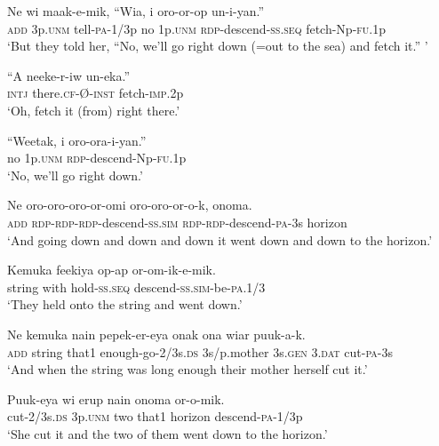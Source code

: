 \ea
\gll  Ne  wi  maak-e-mik,  “Wia,  i  oro-or-op            un-i-yan.” \\
\textsc{add}  3p.\textsc{unm}  tell-\textsc{pa}-1/3p  no  1p.\textsc{unm}  \textsc{rdp}-descend-\textsc{ss.seq} fetch-Np-\textsc{fu}.1p \\


\glt ‘But they told her, “No, we’ll go right down (=out to the sea) and fetch it.” ’ \\
\z


\ea
\gll  “A  neeke-r-iw  un-eka.” \\
\textsc{intj}  there.\textsc{cf}-Ø-\textsc{inst}  fetch-\textsc{imp}.2p \\
\glt ‘Oh, fetch it (from) right there.’ \\
\z


\ea
\gll  “Weetak,  i  oro-ora-i-yan.” \\
no  1p.\textsc{unm}  \textsc{rdp}-descend-Np-\textsc{fu}.1p \\
\glt ‘No, we’ll go right down.’ \\
\z


\ea
\gll  Ne  oro-oro-oro-or-omi  oro-oro-or-o-k,  onoma. \\
\textsc{add}  \textsc{rdp}-\textsc{rdp}-\textsc{rdp}-descend-\textsc{ss}.\textsc{sim}  \textsc{rdp}-\textsc{rdp}-descend-\textsc{pa}-3s  horizon \\
\glt ‘And going down and down and down it went down and down to the horizon.’ \\
\z


\ea
\gll  Kemuka  feekiya  op-ap  or-om-ik-e-mik. \\
string  with  hold-\textsc{ss.seq}  descend-\textsc{ss}.\textsc{sim}-be-\textsc{pa}.1/3 \\
\glt ‘They held onto the string and went down.’ \\
\z


\ea
\gll  Ne  kemuka  nain  pepek-er-eya  onak  ona  wiar  puuk-a-k. \\
\textsc{add}  string  that1  enough-go-2/3s.\textsc{ds}  3s/p.mother  3s.\textsc{gen}  3.\textsc{dat}  cut-\textsc{pa}-3s \\
\glt ‘And when the string was long enough their mother herself cut it.’ \\
\z


\ea
\gll  Puuk-eya  wi  erup  nain  onoma  or-o-mik. \\
cut-2/3s.\textsc{ds}  3p.\textsc{unm}  two  that1  horizon  descend-\textsc{pa}-1/3p \\
\glt ‘She cut it and the two of them went down to the horizon.’ \\
\z


